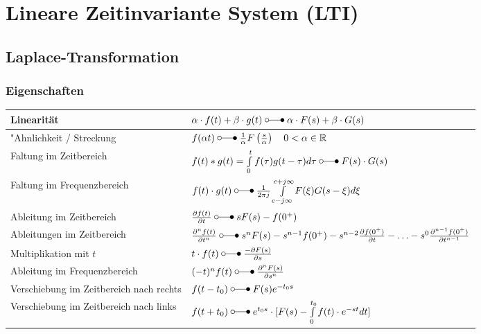 \section{Lineare Zeitinvariante System (LTI)}
\subsection{Laplace-Transformation}


 	\subsubsection{Eigenschaften}
  		\renewcommand{\arraystretch}{2}
  				\begin{tabular}{|l|l|}
  		        	\hline
  		        	Linearität & 
  		 			$\alpha\cdot f(t) + \beta\cdot g(t) \; \laplace \; \alpha\cdot F(s) + \beta\cdot
  		 			G(s)$ \\
  		 			\hline
  		 			"Ahnlichkeit / Streckung &
  		 			$f(\alpha t) \; \laplace \; \frac{1}{\alpha}F \left (\frac{s}{\alpha} \right ) \quad 0
  		 			<\alpha \in\mathbb{R}$ \\
  		 			\hline
  		 			Faltung im Zeitbereich &
  		 			$f(t) \ast g(t) = \int\limits_{0}^{t} f(\tau)g(t-\tau)d\tau \; \laplace \; F(s)
  		 			\cdot G(s)$\\
  		 			\hline
  		 			Faltung im Frequenzbereich &
  		 			$f(t) \cdot g(t) \; \laplace \; \frac{1}{2\pi j}\int\limits_{c-j\infty}^{c+j\infty}
  		 			F(\xi) G(s-\xi)d\xi$ \\
  		 			\hline
  		 			Ableitung im Zeitbereich &
  		 			$\frac{\partial f(t)}{\partial t} \; \laplace \; sF(s)
  		 			-f(0^+)$ \\
  		 			\hline
  		 			Ableitungen im Zeitbereich &
  		 			$\frac{\partial^n f(t)}{\partial t^n} \; \laplace \; s^nF(s)
  		 			-s^{n-1}f(0^+)-s^{n-2}\frac{\partial f(0^+)}{\partial t}-\ldots
  		 			-s^0\frac{\partial^{n-1} f(0^+)}{\partial t^{n-1}}$ \\
  		 			\hline
  		 			Multiplikation mit $t$ &
  		 			$t\cdot f(t)  \; \laplace \; \frac{-\partial F(s)}{\partial s}$ \\
  		 			\hline
  		 			Ableitung im Frequenzbereich &
  		 			$(-t)^n f(t) \; \laplace \;  \frac{\partial^n F(s)}{\partial s^n}$ \\
  		 			\hline
  		 			Verschiebung im Zeitbereich nach rechts &
  		 			$f(t - t_0) \; \laplace \; F(s)e^{- t_0 s}$ \\
  		 			\hline
  					Verschiebung im Zeitbereich nach links &
  					$f(t + t_0) \; \laplace \; e^{t_0 s} \cdot [F(s) - \int\limits_0^{t_0} f(t) \cdot e^{-st} dt]$\\

\end{tabular}
